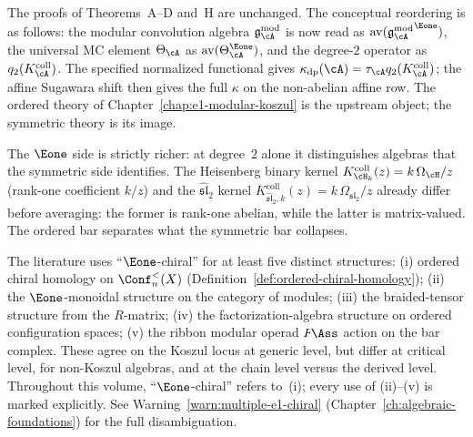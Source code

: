 \begin{remark}
\label{rem:e1-primacy-scope}
The proofs of Theorems~A--D and~H are unchanged.
The conceptual reordering is as follows: the modular convolution
algebra $\gAmod$ is now read as $\operatorname{av}({\gAmod}^{\Eone})$, the
universal MC element $\Theta_\cA$ as $\operatorname{av}(\Theta_\cA^{\Eone})$,
and the degree-$2$ operator as
$q_2(K_\cA^{\mathrm{coll}})$.  The specified normalized functional
gives $\kappa_{\mathrm{dp}}(\cA)=
\tau_\cA q_2(K_\cA^{\mathrm{coll}})$; the affine Sugawara shift then
gives the full $\kappa$ on the non-abelian affine row.
The ordered theory of
Chapter~\ref{chap:e1-modular-koszul} is the upstream object;
the symmetric theory is its image.

The $\Eone$ side is strictly richer: at degree~$2$ alone it
distinguishes algebras that the symmetric side identifies.
The Heisenberg binary kernel
$K_{\cH_k}^{\mathrm{coll}}(z)=k\,\Omega_{\cH}/z$ (rank-one coefficient
$k/z$) and the $\widehat{\mathfrak{sl}}_2$ kernel
$K_{\widehat{\mathfrak{sl}}_2,k}^{\mathrm{coll}}(z)
=k\,\Omega_{\mathfrak{sl}_2}/z$
already differ before averaging: the former is rank-one abelian, while the
latter is matrix-valued. The ordered bar separates what the symmetric
bar collapses.
\end{remark}

\begin{warning}
\label{warn:five-e1-notions-intro}
%
The literature uses ``$\Eone$-chiral'' for at least five distinct
structures: (i) ordered chiral homology on $\Conf_n^<(X)$
(Definition~\ref{def:ordered-chiral-homology});
(ii) the $\Eone$-monoidal structure on the category of modules;
(iii) the braided-tensor structure from the $R$-matrix;
(iv) the factorization-algebra structure on ordered configuration
spaces; (v) the ribbon modular operad $F\!\Ass$ action on the bar
complex. These agree on the Koszul locus at generic level, but
differ at critical level, for non-Koszul algebras, and at the
chain level versus the derived level. Throughout this volume,
``$\Eone$-chiral'' refers to~(i); every use of (ii)--(v) is marked
explicitly.
See Warning~\ref{warn:multiple-e1-chiral}
(Chapter~\ref{ch:algebraic-foundations}) for the full
disambiguation.
\end{warning}

